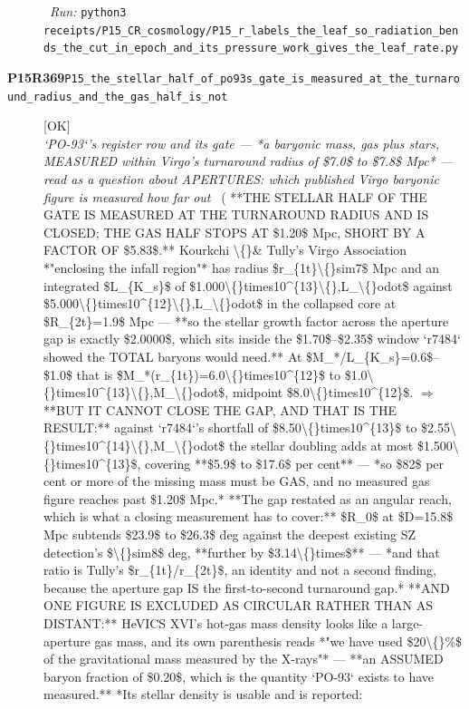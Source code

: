 \begin{description}
\ \emph{Run:} \texttt{python3 receipts/P15\_CR\_cosmology/P15\_r\_labels\_the\_leaf\_so\_radiation\_bends\_the\_cut\_in\_epoch\_and\_its\_pressure\_work\_gives\_the\_leaf\_rate.py}
\item[\rcptlabel{P15_the_stellar_half_of_po93s_gate_is_measured_at_the_turnaround_radius_and_the_gas_half_is_not}{P15R369}\textbf{P15R369}\quad\texttt{P15\_the\_stellar\_half\_of\_po93s\_gate\_is\_measured\_at\_the\_turnaround\_radius\_and\_the\_gas\_half\_is\_not}]\hfill\textsf{[OK]}\\
\textit{`PO-93`'s register row and its gate --- *a baryonic mass, gas plus stars, MEASURED within Virgo's turnaround radius of \$7.0\$ to \$7.8\$ Mpc* --- read as a question about APERTURES: which published Virgo baryonic figure is measured how far out} \ ( **THE STELLAR HALF OF THE GATE IS MEASURED AT THE TURNAROUND RADIUS AND IS CLOSED; THE GAS HALF STOPS AT \$1.20\$ Mpc, SHORT BY A FACTOR OF \$5.83\$.** Kourkchi \textbackslash\{\}\& Tully's Virgo Association *"enclosing the infall region"* has radius \$r\_\{1t\}\textbackslash\{\}sim7\$ Mpc and an integrated \$L\_\{K\_s\}\$ of \$1.000\textbackslash\{\}times10\textasciicircum{}\{13\}\textbackslash\{\},L\_\textbackslash\{\}odot\$ against \$5.000\textbackslash\{\}times10\textasciicircum{}\{12\}\textbackslash\{\},L\_\textbackslash\{\}odot\$ in the collapsed core at \$R\_\{2t\}=1.9\$ Mpc --- **so the stellar growth factor across the aperture gap is exactly \$2.0000\$, which sits inside the \$1.70\$--\$2.35\$ window `r7484` showed the TOTAL baryons would need.** At \$M\_*/L\_\{K\_s\}=0.6\$--\$1.0\$ that is \$M\_*(r\_\{1t\})=6.0\textbackslash\{\}times10\textasciicircum{}\{12\}\$ to \$1.0\textbackslash\{\}times10\textasciicircum{}\{13\}\textbackslash\{\},M\_\textbackslash\{\}odot\$, midpoint \$8.0\textbackslash\{\}times10\textasciicircum{}\{12\}\$. \ensuremath{\Rightarrow} **BUT IT CANNOT CLOSE THE GAP, AND THAT IS THE RESULT:** against `r7484`'s shortfall of \$8.50\textbackslash\{\}times10\textasciicircum{}\{13\}\$ to \$2.55\textbackslash\{\}times10\textasciicircum{}\{14\}\textbackslash\{\},M\_\textbackslash\{\}odot\$ the stellar doubling adds at most \$1.500\textbackslash\{\}times10\textasciicircum{}\{13\}\$, covering **\$5.9\$ to \$17.6\$ per cent** --- *so \$82\$ per cent or more of the missing mass must be GAS, and no measured gas figure reaches past \$1.20\$ Mpc.*  **The gap restated as an angular reach, which is what a closing measurement has to cover:** \$R\_0\$ at \$D=15.8\$ Mpc subtends \$23.9\$ to \$26.3\$ deg against the deepest existing SZ detection's \$\textbackslash\{\}sim8\$ deg, **further by \$3.14\textbackslash\{\}times\$** --- *and that ratio is Tully's \$r\_\{1t\}/r\_\{2t\}\$, an identity and not a second finding, because the aperture gap IS the first-to-second turnaround gap.*  **AND ONE FIGURE IS EXCLUDED AS CIRCULAR RATHER THAN AS DISTANT:** HeVICS XVI's hot-gas mass density looks like a large-aperture gas mass, and its own parenthesis reads *"we have used \$20\textbackslash\{\}\%\$ of the gravitational mass measured by the X-rays"* --- **an ASSUMED baryon fraction of \$0.20\$, which is the quantity `PO-93` exists to have measured.**  *Its stellar density is usable and is reported: 
\end{description}
